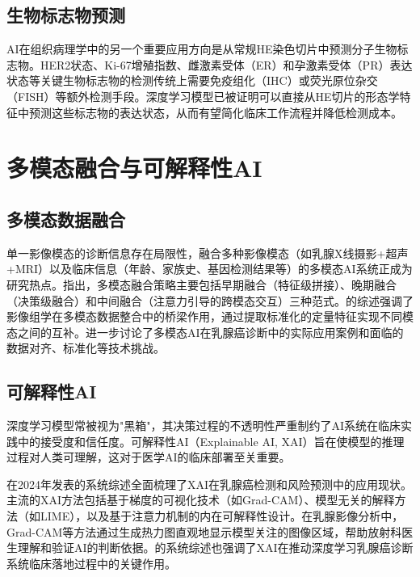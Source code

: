 \documentclass[12pt,a4paper]{article}
\begin{document}
\subsection{生物标志物预测}

AI在组织病理学中的另一个重要应用方向是从常规HE染色切片中预测分子生物标志物。HER2状态、Ki-67增殖指数、雌激素受体（ER）和孕激素受体（PR）表达状态等关键生物标志物的检测传统上需要免疫组化（IHC）或荧光原位杂交（FISH）等额外检测手段。深度学习模型已被证明可以直接从HE切片的形态学特征中预测这些标志物的表达状态，从而有望简化临床工作流程并降低检测成本\citep{jiang2024deep, arunkumar2023review}。

\section{多模态融合与可解释性AI}

\subsection{多模态数据融合}

单一影像模态的诊断信息存在局限性，融合多种影像模态（如乳腺X线摄影+超声+MRI）以及临床信息（年龄、家族史、基因检测结果等）的多模态AI系统正成为研究热点。\citet{zhang2023recent}指出，多模态融合策略主要包括早期融合（特征级拼接）、晚期融合（决策级融合）和中间融合（注意力引导的跨模态交互）三种范式。\citet{qi2024radiomics}的综述强调了影像组学在多模态数据整合中的桥梁作用，通过提取标准化的定量特征实现不同模态之间的互补。\citet{alkarawi2024review}进一步讨论了多模态AI在乳腺癌诊断中的实际应用案例和面临的数据对齐、标准化等技术挑战。

\subsection{可解释性AI}

深度学习模型常被视为"黑箱"，其决策过程的不透明性严重制约了AI系统在临床实践中的接受度和信任度。可解释性AI（Explainable AI, XAI）旨在使模型的推理过程对人类可理解，这对于医学AI的临床部署至关重要。

\citet{ghasemi2024explainable}在2024年发表的系统综述全面梳理了XAI在乳腺癌检测和风险预测中的应用现状。主流的XAI方法包括基于梯度的可视化技术（如Grad-CAM）\citep{selvaraju2017grad}、模型无关的解释方法（如LIME）\citep{ribeiro2016should}，以及基于注意力机制的内在可解释性设计。在乳腺影像分析中，Grad-CAM等方法通过生成热力图直观地显示模型关注的图像区域，帮助放射科医生理解和验证AI的判断依据。\citet{nasser2023deep}的系统综述也强调了XAI在推动深度学习乳腺癌诊断系统临床落地过程中的关键作用。
\end{document}
